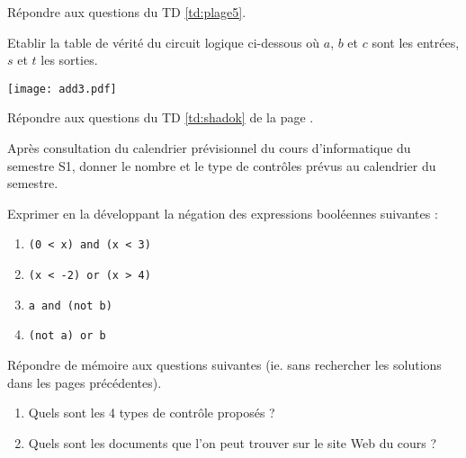	\begin{td}\label{td:TD}
	Répondre aux questions du TD \ref{td:plage5}.
	\end{td}
	
	\begin{td}\label{td:bool}
	Etablir la table de vérité du circuit logique ci-dessous où $a$, $b$
	et $c$ sont les entrées, $s$ et $t$ les sorties.\\[2mm]
	\centerline{\texttt{[image: add3.pdf]}}
	\end{td}
	
	\begin{td}\label{td:competences}
	Répondre aux questions du TD \ref{td:shadok} de la page \pageref{td:shadok}.
	\end{td}



\begin{td}\label{td:controles}
Après consultation du calendrier prévisionnel 
du cours d'informatique du semestre S1,
donner le nombre et le type de contrôles prévus
au calendrier du semestre.
\end{td}

	\begin{td}\label{td:negation}
	Exprimer en la développant la négation des expressions booléennes suivantes :
	\begin{enumerate}
	\item {\tt (0 < x) and (x < 3)}
	\item {\tt (x < -2) or (x > 4)}
	\item {\tt a and (not b)}
	\item {\tt (not a) or b}
	\end{enumerate}
	\end{td}

	\begin{td}\label{td:attention2}
	Répondre de mémoire aux questions suivantes (ie. sans rechercher les 
	solutions dans les pages précédentes).
	\begin{enumerate}
	\item Quels sont les 4 types de contrôle proposés ?
	\item Quels sont les documents que l'on peut trouver sur le site {\sc Web}
		du cours ?
	\end{enumerate}
	\end{td}

